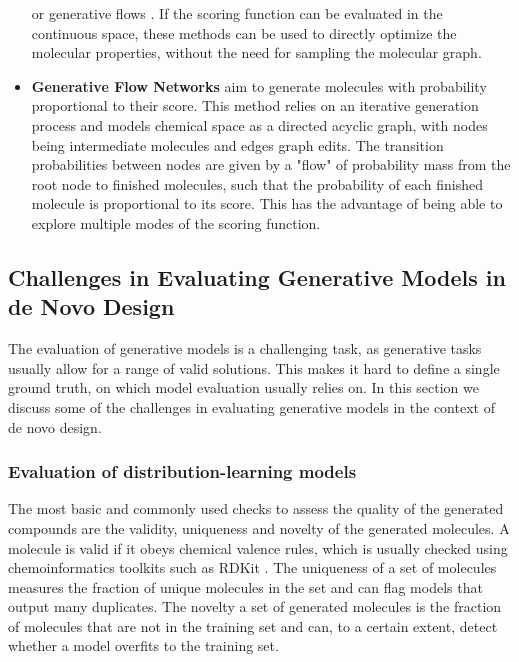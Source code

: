 \begin{itemize}
            or generative flows \citep{madhawaGraphNVPInvertibleFlow2019}. If the scoring function can
            be evaluated in the continuous space, these methods can be used to directly optimize the
            molecular properties, without the need for sampling the molecular graph.
      \item \textbf{Generative Flow Networks} \citep{bengioFlowNetworkBased2021} aim to generate
            molecules with probability proportional to their score. This method relies on an
            iterative generation process and models chemical space as a directed acyclic graph, with
            nodes being intermediate molecules and edges graph edits. The transition probabilities
            between nodes are given by a "flow" of probability mass from the root node to finished
            molecules, such that the probability of each finished molecule is proportional to its
            score. This has the advantage of being able to explore multiple modes of the scoring
            function.
\end{itemize}

\subsection{Challenges in Evaluating Generative Models in de Novo Design}
The evaluation of generative models is a challenging task, as generative tasks usually allow for a
range of valid solutions. This makes it hard to define a single ground truth, on which model
evaluation usually relies on. In this section we discuss some of the challenges in evaluating
generative models in the context of de novo design.

\subsubsection{Evaluation of distribution-learning models}
The most basic and commonly used checks to assess the quality of the generated compounds are the
validity, uniqueness and novelty of the generated molecules. A molecule is valid if it obeys
chemical valence rules, which is usually checked using chemoinformatics toolkits such as RDKit
\citep{landrumRDKitOpensourceCheminformatics2006}. The uniqueness of a set of molecules measures the
fraction of unique molecules in the set and can flag models that output many duplicates. The novelty
a set of generated molecules is the fraction of molecules that are not in the training set and can,
to a certain extent, detect whether a model overfits to the training set.

